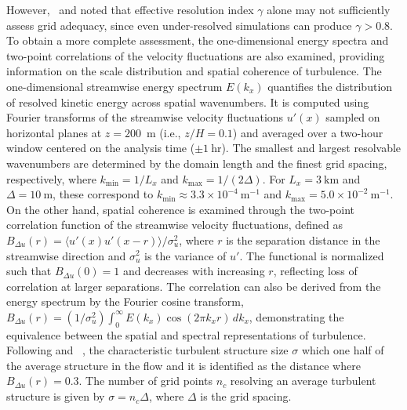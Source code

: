 However, \citet{wurps2020grid}~and \citet{davidson2009large} noted that effective resolution index $\gamma$ alone may not sufficiently assess grid adequacy, since even under-resolved simulations can produce $\gamma > 0.8$. To obtain a more complete assessment, the one-dimensional energy spectra and two-point correlations of the velocity fluctuations are also examined, providing information on the scale distribution and spatial coherence of turbulence. The one-dimensional streamwise energy spectrum $E(k_x)$ quantifies the distribution of resolved kinetic energy across spatial wavenumbers. It is computed using Fourier transforms of the streamwise velocity fluctuations $u'(x)$ sampled on horizontal planes at $z = 200$~m (i.e., $z/H = 0.1$) and averaged over a two-hour window centered on the analysis time ($\pm 1~\mathrm{hr}$). The smallest and largest resolvable wavenumbers are determined by the domain length and the finest grid spacing, respectively, where $k_{\mathrm{min}} = 1/L_x$ and $k_{\mathrm{max}} = 1/(2\Delta)$. For $L_x = 3~\mathrm{km}$ and $\Delta = 10~\mathrm{m}$, these correspond to $k_{\mathrm{min}} \approx 3.3\times10^{-4}~\mathrm{m^{-1}}$ and $k_{\mathrm{max}} = 5.0\times10^{-2}~\mathrm{m^{-1}}$. On the other hand, spatial coherence is examined through the two-point correlation function of the streamwise velocity fluctuations, defined as $B_{\Delta u}(r) = \langle u'(x)u'(x - r)\rangle / \sigma_u^2$, where $r$ is the separation distance in the streamwise direction and $\sigma_u^2$ is the variance of $u'$. The functional is normalized such that $B_{\Delta u}(0)= 1$ and decreases with increasing $r$, reflecting loss of correlation at larger separations. The correlation can also be derived from the energy spectrum by the Fourier cosine transform, $B_{\Delta u} (r) = (1/\sigma_u^2)\int_0^\infty E(k_x)\cos(2\pi k_x r)\,dk_x$, demonstrating the equivalence between the spatial and spectral representations of turbulence. Following \citet{wurps2020grid}and ~\citet{davidson2009large}, the characteristic turbulent structure size $\sigma$ which one half of the average structure in the flow and it is identified as the distance where $B_{\Delta u} (r) =0.3$. The number of grid points $n_c$ resolving an average turbulent structure is given by $\sigma = n_c \Delta$, where $\Delta$ is the grid spacing.

